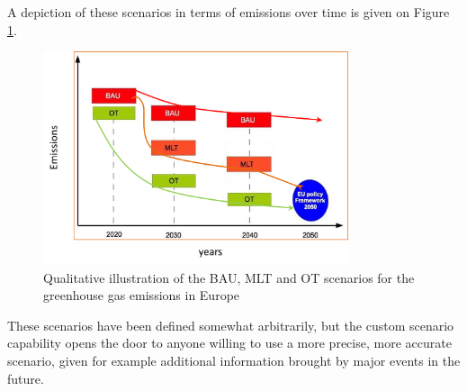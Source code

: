 A depiction of these scenarios in terms of emissions over time is given on Figure \ref{fig:medeas-scenarios}.

\begin{figure}[h]
    \centering
    \includegraphics[width=0.8\textwidth]{resources/images/medeas-scenarios.png}
    \caption{Qualitative illustration of the BAU, MLT and OT scenarios for the greenhouse gas emissions in Europe}
    \label{fig:medeas-scenarios}
\end{figure}

These scenarios have been defined somewhat arbitrarily, but the custom scenario capability opens the door to anyone willing to use a more precise, more accurate scenario, given for example additional information brought by major events in the future.